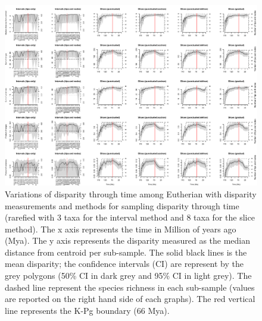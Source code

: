\begin{landscape}
\begin{figure}[!htbp]
\centering
    \includegraphics[width=\textwidth,height=\textheight,keepaspectratio]{Supplementaries/Figures/STD/Eutheria_all_methods_rarefied.pdf}
\caption[Comparison of all the disparity metrics and all the time series methods for Eutheria (rarefied)]{Variations of disparity through time among Eutherian with disparity measurements and methods for sampling disparity through time (rarefied with 3 taxa for the interval method and 8 taxa for the slice method). The x axis represents the time in Million of years ago (Mya). The y axis represents the disparity measured as the median distance from centroid per sub-sample. The solid black lines is the mean disparity; the confidence intervals (CI) are represent by the grey polygons (50\% CI in dark grey and 95\% CI in light grey). The dashed line represent the species richness in each sub-sample (values are reported on the right hand side of each graphs). The red vertical line represents the K-Pg boundary (66 Mya).}
\end{figure}
\label{Supp_disparity_all_Eutheria_rarefied}
\end{landscape}
